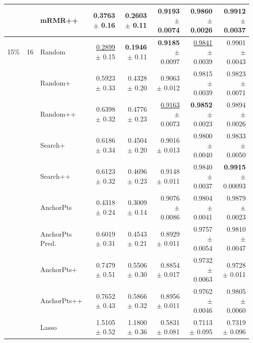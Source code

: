\begin{longtable}{llp{}rrrrr}
 &  & mRMR++ & 0.3763 {\scriptsize $\pm$ 0.16} & 0.2603 {\scriptsize $\pm$ 0.11} & 0.9193 {\scriptsize $\pm$ 0.0074} & 0.9860 {\scriptsize $\pm$ 0.0026} & 0.9912 {\scriptsize $\pm$ 0.0037} \\
\midrule
15\% & 16 & Random & \underline{0.2899} {\scriptsize $\pm$ 0.15} & \textbf{0.1946} {\scriptsize $\pm$ 0.11} & \textbf{0.9185} {\scriptsize $\pm$ 0.0097} & \underline{0.9841} {\scriptsize $\pm$ 0.0039} & 0.9901 {\scriptsize $\pm$ 0.0043} \\
 &  & Random+ & 0.5923 {\scriptsize $\pm$ 0.33} & 0.4328 {\scriptsize $\pm$ 0.20} & 0.9063 {\scriptsize $\pm$ 0.012} & 0.9815 {\scriptsize $\pm$ 0.0039} & 0.9823 {\scriptsize $\pm$ 0.0071} \\
 &  & Random++ & 0.6398 {\scriptsize $\pm$ 0.32} & 0.4776 {\scriptsize $\pm$ 0.23} & \underline{0.9163} {\scriptsize $\pm$ 0.0073} & \textbf{0.9852} {\scriptsize $\pm$ 0.0023} & 0.9894 {\scriptsize $\pm$ 0.0026} \\
 &  & Search+ & 0.6186 {\scriptsize $\pm$ 0.34} & 0.4504 {\scriptsize $\pm$ 0.20} & 0.9016 {\scriptsize $\pm$ 0.013} & 0.9800 {\scriptsize $\pm$ 0.0040} & 0.9833 {\scriptsize $\pm$ 0.0050} \\
 &  & Search++ & 0.6123 {\scriptsize $\pm$ 0.32} & 0.4696 {\scriptsize $\pm$ 0.23} & 0.9148 {\scriptsize $\pm$ 0.011} & 0.9840 {\scriptsize $\pm$ 0.0037} & \textbf{0.9915} {\scriptsize $\pm$ 0.00093} \\
 &  & AnchorPts & 0.4318 {\scriptsize $\pm$ 0.24} & 0.3009 {\scriptsize $\pm$ 0.14} & 0.9076 {\scriptsize $\pm$ 0.0086} & 0.9804 {\scriptsize $\pm$ 0.0041} & 0.9879 {\scriptsize $\pm$ 0.0023} \\
 &  & AnchorPts Pred. & 0.6019 {\scriptsize $\pm$ 0.31} & 0.4543 {\scriptsize $\pm$ 0.21} & 0.8929 {\scriptsize $\pm$ 0.011} & 0.9757 {\scriptsize $\pm$ 0.0054} & 0.9810 {\scriptsize $\pm$ 0.0047} \\
 &  & AnchorPts+ & 0.7479 {\scriptsize $\pm$ 0.51} & 0.5506 {\scriptsize $\pm$ 0.30} & 0.8854 {\scriptsize $\pm$ 0.017} & 0.9732 {\scriptsize $\pm$ 0.0063} & 0.9728 {\scriptsize $\pm$ 0.011} \\
 &  & AnchorPts++ & 0.7652 {\scriptsize $\pm$ 0.43} & 0.5866 {\scriptsize $\pm$ 0.32} & 0.8956 {\scriptsize $\pm$ 0.011} & 0.9762 {\scriptsize $\pm$ 0.0046} & 0.9805 {\scriptsize $\pm$ 0.0060} \\
 &  & Lasso & 1.5105 {\scriptsize $\pm$ 0.52} & 1.1800 {\scriptsize $\pm$ 0.36} & 0.5831 {\scriptsize $\pm$ 0.081} & 0.7113 {\scriptsize $\pm$ 0.095} & 0.7319 {\scriptsize $\pm$ 0.096} \\

\end{longtable}
